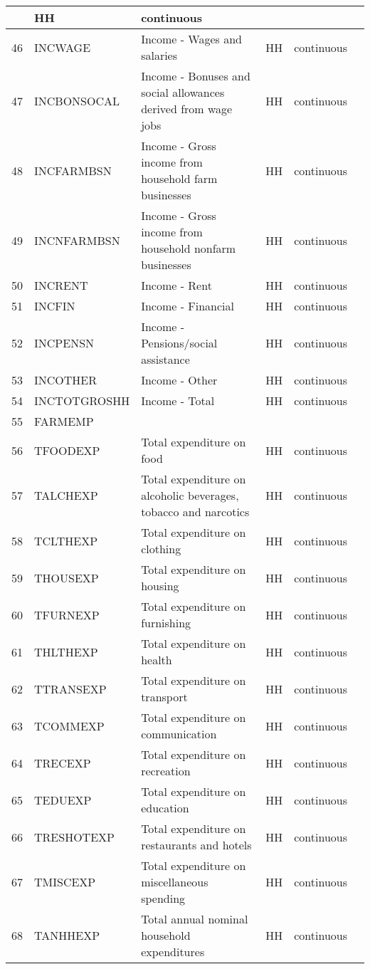 \documentclass[letterpaper,10pt,english]{sphinxmanual}
\begin{document}
\begin{savenotes}
\begin{longtable}[c]{|l|l|l|l|l|l|}
&
HH
&
continuous
&\\
\hline
46
&
INCWAGE
&
Income - Wages and salaries
&
HH
&
continuous
&\\
\hline
47
&
INCBONSOCAL
&
Income - Bonuses and social
allowances derived from wage jobs
&
HH
&
continuous
&\\
\hline
48
&
INCFARMBSN
&
Income - Gross income
from household farm businesses
&
HH
&
continuous
&\\
\hline
49
&
INCNFARMBSN
&
Income - Gross income from
household nonfarm businesses
&
HH
&
continuous
&\\
\hline
50
&
INCRENT
&
Income - Rent
&
HH
&
continuous
&\\
\hline
51
&
INCFIN
&
Income - Financial
&
HH
&
continuous
&\\
\hline
52
&
INCPENSN
&
Income - Pensions/social assistance
&
HH
&
continuous
&\\
\hline
53
&
INCOTHER
&
Income - Other
&
HH
&
continuous
&\\
\hline
54
&
INCTOTGROSHH
&
Income - Total
&
HH
&
continuous
&\\
\hline
55
&
FARMEMP
&&&&\\
\hline
56
&
TFOODEXP
&
Total expenditure on food
&
HH
&
continuous
&\\
\hline
57
&
TALCHEXP
&
Total expenditure on alcoholic
beverages, tobacco and narcotics
&
HH
&
continuous
&\\
\hline
58
&
TCLTHEXP
&
Total expenditure on clothing
&
HH
&
continuous
&\\
\hline
59
&
THOUSEXP
&
Total expenditure on housing
&
HH
&
continuous
&\\
\hline
60
&
TFURNEXP
&
Total expenditure on furnishing
&
HH
&
continuous
&\\
\hline
61
&
THLTHEXP
&
Total expenditure on health
&
HH
&
continuous
&\\
\hline
62
&
TTRANSEXP
&
Total expenditure on transport
&
HH
&
continuous
&\\
\hline
63
&
TCOMMEXP
&
Total expenditure on communication
&
HH
&
continuous
&\\
\hline
64
&
TRECEXP
&
Total expenditure on recreation
&
HH
&
continuous
&\\
\hline
65
&
TEDUEXP
&
Total expenditure on education
&
HH
&
continuous
&\\
\hline
66
&
TRESHOTEXP
&
Total expenditure on restaurants
and hotels
&
HH
&
continuous
&\\
\hline
67
&
TMISCEXP
&
Total expenditure on
miscellaneous spending
&
HH
&
continuous
&\\
\hline
68
&
TANHHEXP
&
Total annual nominal household
expenditures
&
HH
&
continuous
&\\
\hline
\end{longtable}\sphinxatlongtableend\end{savenotes}
\end{document}
